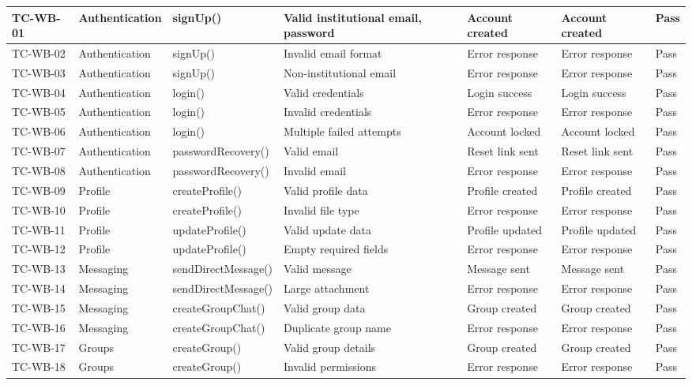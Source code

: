 {\begin{longtable}{|p{1.5cm}|p{2.2cm}|p{2.5cm}|p{2.5cm}|p{2.5cm}|p{2.5cm}|p{1.5cm}|}
TC-WB-01 & Authentication & signUp() & Valid institutional email, password & Account created & Account created & Pass \\
\hline
TC-WB-02 & Authentication & signUp() & Invalid email format & Error response & Error response & Pass \\
\hline
TC-WB-03 & Authentication & signUp() & Non-institutional email & Error response & Error response & Pass \\
\hline
TC-WB-04 & Authentication & login() & Valid credentials & Login success & Login success & Pass \\
\hline
TC-WB-05 & Authentication & login() & Invalid credentials & Error response & Error response & Pass \\
\hline
TC-WB-06 & Authentication & login() & Multiple failed attempts & Account locked & Account locked & Pass \\
\hline
TC-WB-07 & Authentication & passwordRecovery() & Valid email & Reset link sent & Reset link sent & Pass \\
\hline
TC-WB-08 & Authentication & passwordRecovery() & Invalid email & Error response & Error response & Pass \\
\hline
TC-WB-09 & Profile & createProfile() & Valid profile data & Profile created & Profile created & Pass \\
\hline
TC-WB-10 & Profile & createProfile() & Invalid file type & Error response & Error response & Pass \\
\hline
TC-WB-11 & Profile & updateProfile() & Valid update data & Profile updated & Profile updated & Pass \\
\hline
TC-WB-12 & Profile & updateProfile() & Empty required fields & Error response & Error response & Pass \\
\hline
TC-WB-13 & Messaging & sendDirectMessage() & Valid message & Message sent & Message sent & Pass \\
\hline
TC-WB-14 & Messaging & sendDirectMessage() & Large attachment & Error response & Error response & Pass \\
\hline
TC-WB-15 & Messaging & createGroupChat() & Valid group data & Group created & Group created & Pass \\
\hline
TC-WB-16 & Messaging & createGroupChat() & Duplicate group name & Error response & Error response & Pass \\
\hline
TC-WB-17 & Groups & createGroup() & Valid group details & Group created & Group created & Pass \\
\hline
TC-WB-18 & Groups & createGroup() & Invalid permissions & Error response & Error response & Pass \\

\end{longtable}}
